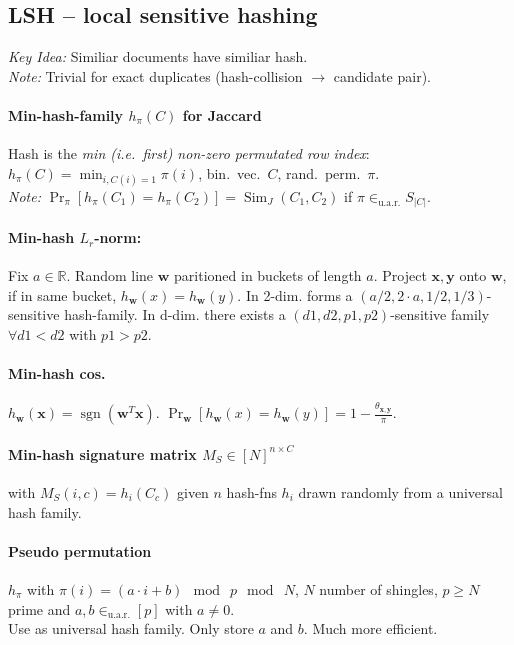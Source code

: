 \documentclass[11pt]{scrartcl}
\DeclareMathOperator{\sign}{sgn}
\DeclareMathOperator{\Sim}{Sim}
\newcommand{\R}{\mathbb{R}}
\newcommand{\inuar}{\in_{\text{u.a.r.}}}
\begin{document}
\begin{multicols}{3}
\subsection{LSH -- local sensitive hashing}
\emph{Key Idea:} Similiar documents have similiar hash. \\
\emph{Note:} Trivial for exact duplicates (hash-collision $\rightarrow$ candidate pair).
\paragraph{Min-hash-family $h_\pi(C)$ for Jaccard}
Hash is the \emph{min (i.e.\ first) non-zero permutated row index}: $h_\pi(C) = \min_{i, C(i) = 1} \pi(i)$,
bin.\ vec.\ $C$, rand.\ perm.\ $\pi$. \\
\emph{Note:} $\Pr_\pi[h_\pi(C_1) = h_\pi(C_2)] = \Sim_J(C_1,C_2)$ if $\pi \inuar S_{|C|}$.
\paragraph{Min-hash $L_r$-norm:}
Fix $a \in \R$.
Random line $\bm w$ paritioned in buckets of length $a$.
Project $\bm x, \bm y$ onto $\bm w$, if in same bucket, $h_{\bm w}(x) = h_{\bm w}(y)$.
In 2-dim. forms a $(a/2, 2\cdot a, 1/2, 1/3)$-sensitive hash-family.
In d-dim. there exists a $(d1, d2, p1, p2)$-sensitive family $\forall d1 < d2$ with $p1 > p2$.
\paragraph{Min-hash cos.} $h_{\bm w}(\bm x) = \sign(\bm w^T\bm x)$. $\Pr_{\bm w}[h_{\bm w}(x) = h_{\bm w}(y)] = 1 - \frac{\theta_{\bm x, \bm y}}{\pi}$.
\paragraph{Min-hash signature matrix $M_S \in [N]^{n\times C}$}
with $M_S(i,c) = h_i(C_c)$
given $n$ hash-fns $h_i$ drawn randomly from a universal hash family.

\paragraph{Pseudo permutation}
$h_\pi$ with $\pi(i) = (a\cdot i + b) \mod\ p \mod\ N$, $N$ number of shingles, $p\geq N$ prime and $a,b \inuar [p]$ with $a \neq 0$. \\
Use as universal hash family. Only store $a$ and $b$. Much more efficient.


\end{multicols}
\end{document}

